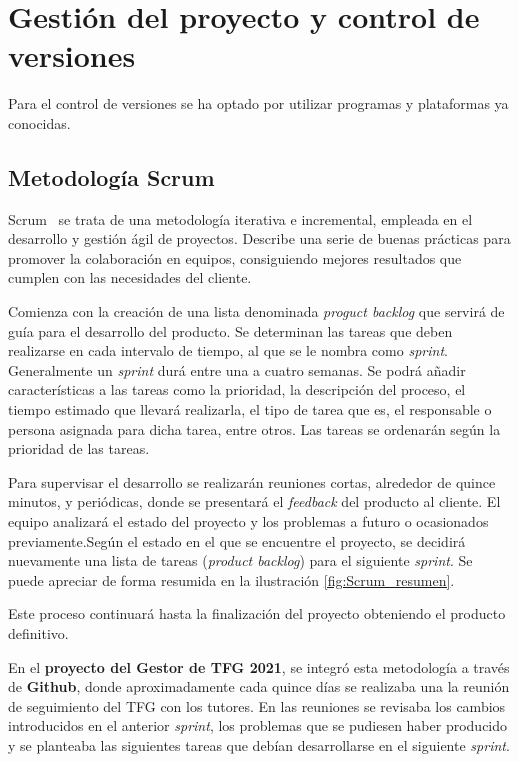 \section{Gestión del proyecto y control de versiones}
Para el control de versiones se ha optado por utilizar programas y plataformas ya conocidas.

\subsection{Metodología Scrum}
Scrum~\cite{pagina_Scrum} se trata de una metodología iterativa e incremental, empleada en el desarrollo y gestión ágil de proyectos. Describe una serie de buenas prácticas para promover la colaboración en equipos, consiguiendo mejores resultados que cumplen con las necesidades del cliente.

Comienza con la creación de una lista denominada \emph{proguct backlog} que servirá de guía para el desarrollo del producto. Se determinan las tareas que deben realizarse en cada intervalo de tiempo, al que se le nombra como \emph{sprint}. Generalmente un \emph{sprint} durá entre una a cuatro semanas. Se podrá añadir características a las tareas como la prioridad, la descripción del proceso, el tiempo estimado que llevará realizarla, el tipo de tarea que es, el responsable o persona asignada para dicha tarea, entre otros. Las tareas se ordenarán según la prioridad de las tareas.

Para supervisar el desarrollo se realizarán reuniones cortas, alrededor de quince minutos, y periódicas, donde se presentará el \emph{feedback} del producto al cliente. El equipo analizará el estado del proyecto y los problemas a futuro o ocasionados previamente.Según el estado en el que se encuentre el proyecto, se decidirá nuevamente una lista de tareas (\emph{product backlog}) para el siguiente \emph{sprint}. Se puede apreciar de forma resumida en la ilustración \ref{fig:Scrum_resumen}.


Este proceso continuará hasta la finalización del proyecto obteniendo el producto definitivo.

En el \textbf{proyecto del Gestor de TFG 2021}, se integró esta metodología a través de \textbf{Github}, donde aproximadamente cada quince días se realizaba una la reunión de seguimiento del TFG con los tutores. En las reuniones se revisaba los cambios introducidos en el anterior \emph{sprint}, los problemas que se pudiesen haber producido y se planteaba las siguientes tareas que debían desarrollarse en el siguiente \emph{sprint}.

